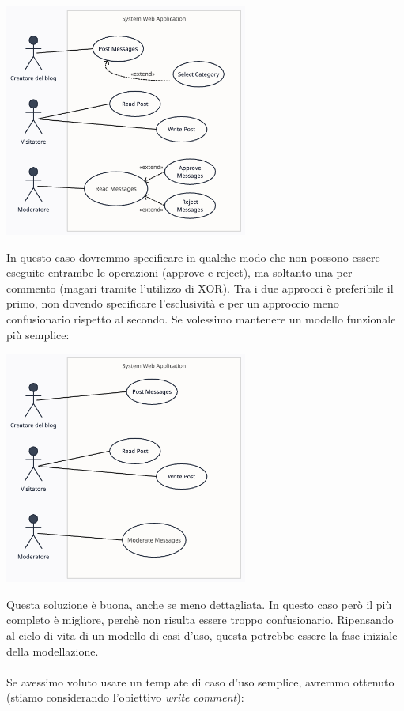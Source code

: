 \documentclass{article}
\begin{document}
\begin{center}
    \includegraphics[width=0.6\textwidth]{foto 10.png}
\end{center}
In questo caso dovremmo specificare in qualche modo che non possono essere eseguite entrambe le operazioni (approve e reject), ma soltanto una per commento (magari tramite l'utilizzo di XOR). Tra i due approcci è preferibile il primo, non dovendo specificare l'esclusività e per un approccio meno confusionario rispetto al secondo.
Se volessimo mantenere un modello funzionale più semplice:
\begin{center}
    \includegraphics[width=0.6\textwidth]{foto 11.png}
\end{center}
Questa soluzione è buona, anche se meno dettagliata. In questo caso però il più completo è migliore, perchè non risulta essere troppo confusionario. Ripensando al ciclo di vita di un modello di casi d'uso, questa potrebbe essere la fase iniziale della modellazione.\\ \\
Se avessimo voluto usare un template di caso d'uso semplice, avremmo ottenuto (stiamo considerando l'obiettivo \textit{write comment}):
\end{document}
